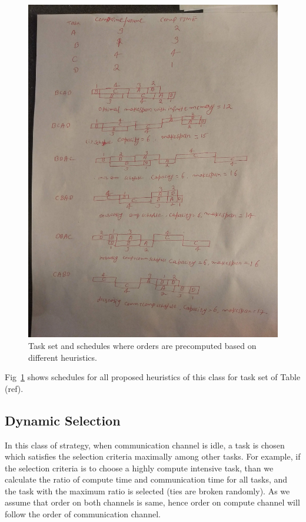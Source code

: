 \documentclass[runningheads]{llncs} %
\begin{document}
\begin{figure}[htb]
	
	\includegraphics[scale=0.05]{Figs/staticOrderSchedules}
			\caption{Task set and schedules where orders are precomputed based on different heuristics.}
	\label{fig:staticOrderExample}
\end{figure}

Fig~\ref{fig:staticOrderExample} shows schedules for all proposed heuristics of this class for task set of Table (ref).
\subsection{Dynamic Selection}

In this class of strategy, when communication channel is idle, a task is chosen which satisfies the selection criteria maximally among other tasks. For example, if the selection criteria is to choose a highly compute intensive task, than  we calculate the ratio of compute time and communication time for all tasks, and the task with the  maximum ratio is selected (ties are broken randomly). As we assume that order on both channels is same, hence order on compute channel will follow the order of communication channel.
\end{document}
